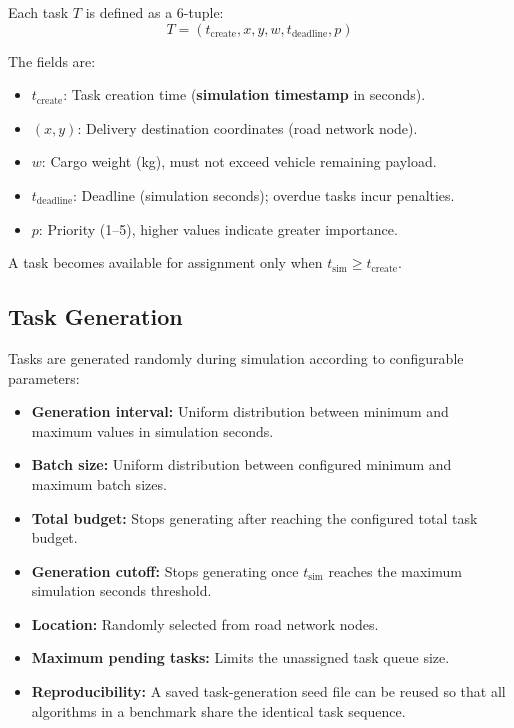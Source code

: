 Each task $T$ is defined as a 6-tuple:
\begin{equation}
    T = (t_{\text{create}}, x, y, w, t_{\text{deadline}}, p)
\end{equation}

The fields are:
\begin{itemize}[leftmargin=4em]
    \item $t_{\text{create}}$: Task creation time (\textbf{simulation timestamp} in seconds).
    \item $(x, y)$: Delivery destination coordinates (road network node).
    \item $w$: Cargo weight (kg), must not exceed vehicle remaining payload.
    \item $t_{\text{deadline}}$: Deadline (simulation seconds); overdue tasks incur penalties.
    \item $p$: Priority (1--5), higher values indicate greater importance.
\end{itemize}

A task becomes available for assignment only when $t_{\text{sim}} \ge t_{\text{create}}$.

\subsection{Task Generation}

Tasks are generated randomly during simulation according to configurable parameters:
\begin{itemize}[leftmargin=4em]
    \item \textbf{Generation interval:} Uniform distribution between minimum and maximum values in simulation seconds.
    \item \textbf{Batch size:} Uniform distribution between configured minimum and maximum batch sizes.
    \item \textbf{Total budget:} Stops generating after reaching the configured total task budget.
    \item \textbf{Generation cutoff:} Stops generating once $t_{\text{sim}}$ reaches the maximum simulation seconds threshold.
    \item \textbf{Location:} Randomly selected from road network nodes.
    \item \textbf{Maximum pending tasks:} Limits the unassigned task queue size.
    \item \textbf{Reproducibility:} A saved task-generation seed file can be reused so that all algorithms in a benchmark share the identical task sequence.
\end{itemize}


